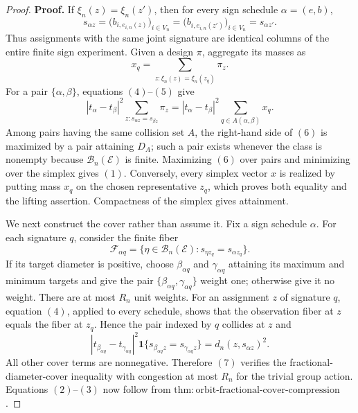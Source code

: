 \documentclass{article}
\begin{document}
\begin{proof}
\textbf{Proof.}
If \(\xi_n(z)=\xi_n(z')\), then for every sign schedule \(\alpha=(e,b)\),
\[
 s_{\alpha z}
 =\bigl(b_{i,e_{i,n}(z)}\bigr)_{i\in V_n}
 =\bigl(b_{i,e_{i,n}(z')}\bigr)_{i\in V_n}
 =s_{\alpha z'}. \tag{4}
\]
Thus assignments with the same joint signature are identical columns of the entire finite sign experiment. Given a design \(\pi\), aggregate its masses as
\[
 x_q=\sum_{z:\xi_n(z)=\xi_n(z_q)}\pi_z. \tag{5}
\]
For a pair \(\{\alpha,\beta\}\), equations \((4)\)--\((5)\) give
\[
 |t_\alpha-t_\beta|^2
 \sum_{z:s_{\alpha z}=s_{\beta z}}\pi_z
 =|t_\alpha-t_\beta|^2
 \sum_{q\in A(\alpha,\beta)}x_q. \tag{6}
\]
Among pairs having the same collision set \(A\), the right-hand side of \((6)\) is maximized by a pair attaining \(D_A\); such a pair exists whenever the class is nonempty because \(\mathcal B_n(\mathcal E)\) is finite. Maximizing \((6)\) over pairs and minimizing over the simplex gives \((1)\). Conversely, every simplex vector \(x\) is realized by putting mass \(x_q\) on the chosen representative \(z_q\), which proves both equality and the lifting assertion. Compactness of the simplex gives attainment.

We next construct the cover rather than assume it. Fix a sign schedule \(\alpha\). For each signature \(q\), consider the finite fiber
\[
 \mathcal F_{\alpha q}
 =\{\eta\in\mathcal B_n(\mathcal E):s_{\eta z_q}=s_{\alpha z_q}\}.
\]
If its target diameter is positive, choose \(\beta_{\alpha q}\) and \(\gamma_{\alpha q}\) attaining its maximum and minimum targets and give the pair \(\{\beta_{\alpha q},\gamma_{\alpha q}\}\) weight one; otherwise give it no weight. There are at most \(R_n\) unit weights. For an assignment \(z\) of signature \(q\), equation \((4)\), applied to every schedule, shows that the observation fiber at \(z\) equals the fiber at \(z_q\). Hence the pair indexed by \(q\) collides at \(z\) and
\[
 |t_{\beta_{\alpha q}}-t_{\gamma_{\alpha q}}|^2
 \mathbf 1\{s_{\beta_{\alpha q}z}=s_{\gamma_{\alpha q}z}\}
 =d_n(z,s_{\alpha z})^2. \tag{7}
\]
All other cover terms are nonnegative. Therefore \((7)\) verifies the fractional-diameter-cover inequality with congestion at most \(R_n\) for the trivial group action. Equations \((2)\)--\((3)\) now follow from \(\mathrm{thm{:}orbit\text{-}fractional\text{-}cover\text{-}compression}\).


\end{proof}
\end{document}
